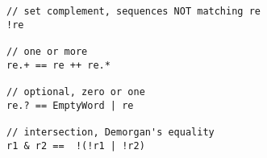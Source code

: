 \begin{lstlisting}[style=scalaioScala]
// set complement, sequences NOT matching re
!re 

// one or more
re.+ == re ++ re.*

// optional, zero or one
re.? == EmptyWord | re

// intersection, Demorgan's equality
r1 & r2 ==  !(!r1 | !r2)
\end{lstlisting}
